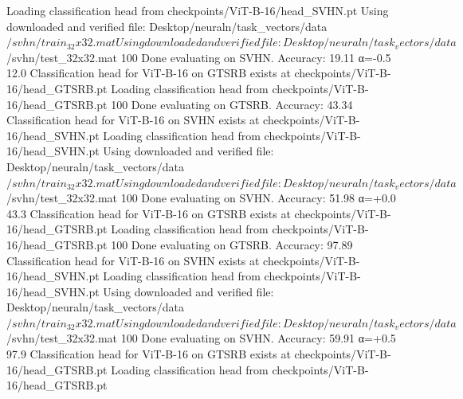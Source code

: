Loading classification head from checkpoints/ViT-B-16/head_SVHN.pt
Using downloaded and verified file: Desktop/neuraln/task_vectors/data$/svhn/train_32x32.mat
Using downloaded and verified file: Desktop/neuraln/task_vectors/data$/svhn/test_32x32.mat
100%
Done evaluating on SVHN. Accuracy: 19.11%
  α=-0.5        12.0%
Classification head for ViT-B-16 on GTSRB exists at checkpoints/ViT-B-16/head_GTSRB.pt
Loading classification head from checkpoints/ViT-B-16/head_GTSRB.pt
100%
Done evaluating on GTSRB. Accuracy: 43.34%
Classification head for ViT-B-16 on SVHN exists at checkpoints/ViT-B-16/head_SVHN.pt
Loading classification head from checkpoints/ViT-B-16/head_SVHN.pt
Using downloaded and verified file: Desktop/neuraln/task_vectors/data$/svhn/train_32x32.mat
Using downloaded and verified file: Desktop/neuraln/task_vectors/data$/svhn/test_32x32.mat
100%
Done evaluating on SVHN. Accuracy: 51.98%
  α=+0.0        43.3%
Classification head for ViT-B-16 on GTSRB exists at checkpoints/ViT-B-16/head_GTSRB.pt
Loading classification head from checkpoints/ViT-B-16/head_GTSRB.pt
100%
Done evaluating on GTSRB. Accuracy: 97.89%
Classification head for ViT-B-16 on SVHN exists at checkpoints/ViT-B-16/head_SVHN.pt
Loading classification head from checkpoints/ViT-B-16/head_SVHN.pt
Using downloaded and verified file: Desktop/neuraln/task_vectors/data$/svhn/train_32x32.mat
Using downloaded and verified file: Desktop/neuraln/task_vectors/data$/svhn/test_32x32.mat
100%
Done evaluating on SVHN. Accuracy: 59.91%
  α=+0.5        97.9%
Classification head for ViT-B-16 on GTSRB exists at checkpoints/ViT-B-16/head_GTSRB.pt
Loading classification head from checkpoints/ViT-B-16/head_GTSRB.pt
